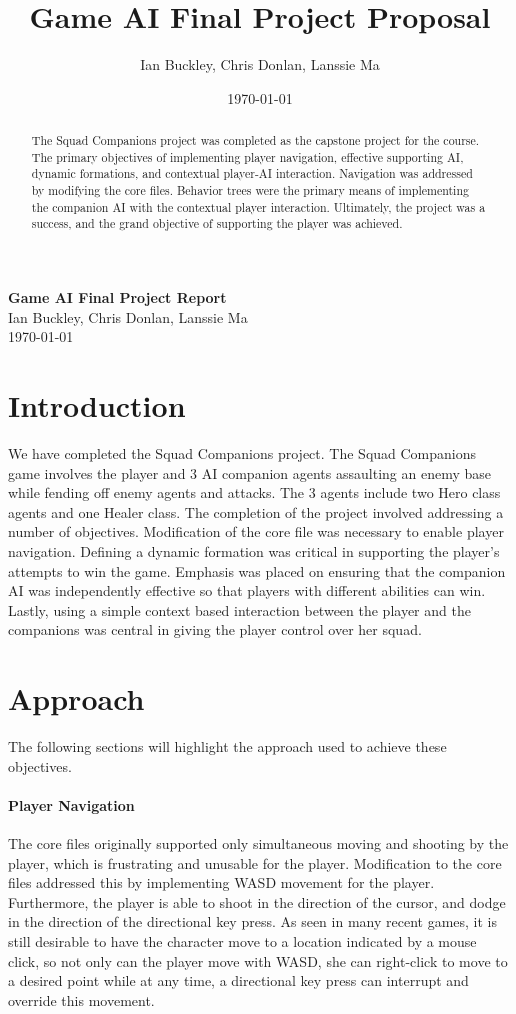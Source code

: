 \documentclass[11pt]{article}
\title{Game AI Final Project Proposal}
\author{Ian Buckley, Chris Donlan, Lanssie Ma}
\date{\today}
\begin{document}
\begin{center}
\textbf{Game AI Final Project Report}\\
Ian Buckley, Chris Donlan, Lanssie Ma\\
\today
\end{center}
\begin{abstract}
The Squad Companions project was completed as the capstone project for the course. The primary objectives of implementing player navigation, effective supporting AI, dynamic formations, and contextual player-AI interaction. Navigation was addressed by modifying the core files. Behavior trees were the primary means of implementing the companion AI with the contextual player interaction. Ultimately, the project was a success, and the grand objective of supporting the player was achieved.
\end{abstract}
\section{Introduction}
We have completed the Squad Companions project. The Squad Companions game involves the player and 3 AI companion agents assaulting an enemy base while fending off enemy agents and attacks. The 3 agents include two Hero class agents and one Healer class. The completion of the project involved addressing a number of objectives. Modification of the core file was necessary to enable player navigation. Defining a dynamic formation was critical in supporting the player's attempts to win the game. Emphasis was placed on ensuring that the companion AI was independently effective so that players with different abilities can win. Lastly, using a simple context based interaction between the player and the companions was central in giving the player control over her squad. 

\section{Approach}
The following sections will highlight the approach used to achieve these objectives.

\paragraph{Player Navigation}
The core files originally supported only simultaneous moving and shooting by the player, which is frustrating and unusable for the player. Modification to the core files addressed this by implementing WASD movement for the player. Furthermore, the player is able to shoot in the direction of the cursor, and dodge in the direction of the directional key press. As seen in many recent games, it is still desirable to have the character move to a location indicated by a mouse click, so not only can the player move with WASD, she can right-click to move to a desired point while at any time, a directional key press can interrupt and override this movement.
\end{document}

